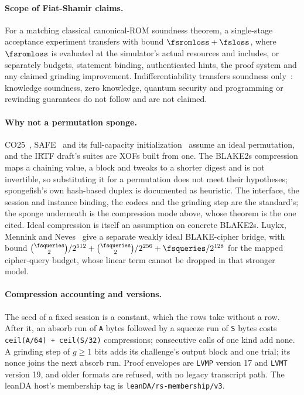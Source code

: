 \paragraph{Scope of Fiat-Shamir claims.} For a matching classical canonical-ROM soundness theorem, a single-stage acceptance experiment transfers with bound $\fsromloss+\fsloss$, where $\fsromloss$ is evaluated at the simulator's actual resources and includes, or separately budgets, statement binding, authenticated hints, the proof system and any claimed grinding improvement. Indifferentiability transfers soundness only~\cite[\S2.3]{CO25}: knowledge soundness, zero knowledge, quantum security and programming or rewinding guarantees do not follow and are not claimed.

\paragraph{Why not a permutation sponge.} CO25~\cite{CO25}, SAFE~\cite{SAFE23} and its full-capacity initialization~\cite[Theorem 2]{KMM23} assume an ideal permutation, and the IRTF draft's suites are XOFs built from one. The BLAKE2s compression maps a chaining value, a block and tweaks to a shorter digest and is not invertible, so substituting it for a permutation does not meet their hypotheses; spongefish's own hash-based duplex is documented as heuristic. The interface, the session and instance binding, the codecs and the grinding step are the standard's; the sponge underneath is the compression mode above, whose theorem is the one cited. Ideal compression is itself an assumption on concrete BLAKE2s. Luykx, Mennink and Neves~\cite[Theorem 1]{LMN16} give a separate weakly ideal BLAKE-cipher bridge, with bound $\binom{\fsqueries}{2}/2^{512}+\binom{\fsqueries}{2}/2^{256}+\fsqueries/2^{128}$ for the mapped cipher-query budget, whose linear term cannot be dropped in that stronger model.

\paragraph{Compression accounting and versions.} The seed of a fixed session is a constant, which the rows take without a row. After it, an absorb run of \texttt{A} bytes followed by a squeeze run of \texttt{S} bytes costs \texttt{ceil(A/64) + ceil(S/32)} compressions; consecutive calls of one kind add none. A grinding step of $g\ge1$ bits adds its challenge's output block and one trial; its nonce joins the next absorb run. Proof envelopes are \texttt{LVMP} version 17 and \texttt{LVMT} version 19, and older formats are refused, with no legacy transcript path. The leanDA host's membership tag is \texttt{leanDA/rs-membership/v3}.


